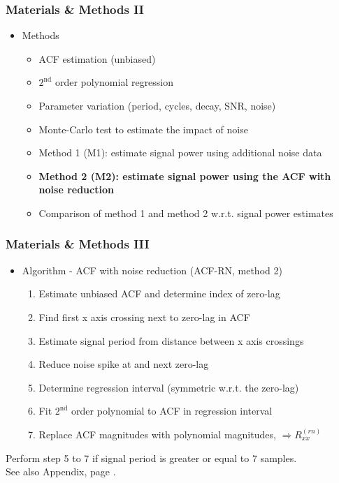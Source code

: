 \documentclass[11pt,aspectratio=169]{beamer}
\begin{document}
	\begin{frame}
		\frametitle{Materials \& Methods II}
		\begin{itemize}
			\setlength\itemsep{0.5em}
			\item \textcolor{RIPtitlecol}{Methods}
			\begin{itemize}
				\setlength\itemsep{0.5em}
				\item ACF estimation (unbiased)
				\item $2^{\text{nd}}$ order polynomial regression
				\item Parameter variation (period, cycles, decay, SNR, noise)
				\item Monte-Carlo test to estimate the impact of noise
				\item Method 1 (M1): estimate signal power using additional noise data
				\item \textbf{Method 2 (M2): estimate signal power using the ACF with noise reduction}
				\item Comparison of method 1 and method 2 w.r.t. signal power estimates
			\end{itemize}
		\end{itemize}
	\end{frame}
	\begin{frame}
		\frametitle{Materials \& Methods III}
		\begin{itemize}
			\setlength\itemsep{0.5em}
			\item \textcolor{RIPtitlecol}{Algorithm - ACF with noise reduction (ACF-RN, method 2)}
			\begin{enumerate}
				\setlength\itemsep{0.5em}
				\item Estimate unbiased ACF and determine index of zero-lag
				\item Find first x axis crossing next to zero-lag in ACF
				\item Estimate signal period from distance between x axis crossings
				\item Reduce noise spike at and next zero-lag
				\item Determine regression interval (symmetric w.r.t. the zero-lag)
				\item Fit $2^{\text{nd}}$ order polynomial to ACF in regression interval
				\item Replace ACF magnitudes with polynomial magnitudes, $\Rightarrow R_{xx}^{(rn)}$
			\end{enumerate}
		\end{itemize}
		\vspace*{.5em}
		\small Perform step 5 to 7 if signal period is greater or equal to 7 samples.\\
		See also Appendix, page \pageref{app:algorithm}.
	\end{frame}
\end{document}
